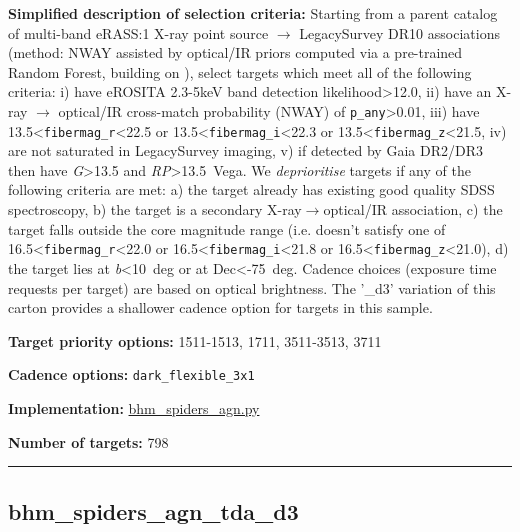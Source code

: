 \noindent\textbf{Simplified description of selection criteria:} Starting from a
parent catalog of multi-band eRASS:1 X-ray point source $\rightarrow$ LegacySurvey
DR10 associations (method: NWAY assisted by optical/IR priors computed
via a pre-trained Random Forest, building on
\citealt{Salvato2022}), select targets which meet all of the following criteria:
i) have eROSITA 2.3-5keV band detection likelihood\textgreater12.0, ii)
have an X-ray $\rightarrow$ optical/IR cross-match probability (NWAY) of
\texttt{p\_any}\textgreater0.01, iii) have
13.5\textless{}\texttt{fibermag\_r}\textless22.5 or
13.5\textless{}\texttt{fibermag\_i}\textless22.3 or
13.5\textless{}\texttt{fibermag\_z}\textless21.5, iv) are not saturated
in LegacySurvey imaging, v) if detected by Gaia DR2/DR3 then have
\emph{G}\textgreater13.5 and \emph{RP}\textgreater13.5~Vega. We
\emph{deprioritise} targets if any of the following criteria are met: a)
the target already has existing good quality SDSS spectroscopy, b) the
target is a secondary X-ray$\rightarrow$optical/IR association, c) the target falls
outside the core magnitude range (i.e. doesn't satisfy one of
16.5\textless{}\texttt{fibermag\_r}\textless22.0 or
16.5\textless{}\texttt{fibermag\_i}\textless21.8 or
16.5\textless{}\texttt{fibermag\_z}\textless21.0), d) the target lies at
\textbar{}\emph{b}\textbar\textless10~deg or at Dec\textless-75~deg.
Cadence choices (exposure time requests per target) are based on optical
brightness. The '\_d3' variation of this carton provides a shallower
cadence option for targets in this sample.


\noindent\textbf{Target priority options:} 1511-1513, 1711, 3511-3513, 3711

\noindent\textbf{Cadence options:} \texttt{dark\_flexible\_3x1}

\noindent\textbf{Implementation:}
\href{https://github.com/sdss/target_selection/blob/1.3.3/python/target_selection/cartons/bhm_spiders_agn.py}{bhm\_spiders\_agn.py}

\noindent\textbf{Number of targets:} 798

\begin{center}\rule{0.5\linewidth}{0.5pt}\end{center}

\hypertarget{bhm_spiders_agn_tda_d3_plan1.2.4}{%
\subsection{bhm\_spiders\_agn\_tda\_d3}\label{bhm_spiders_agn_tda_d3_plan1.2.4}}

